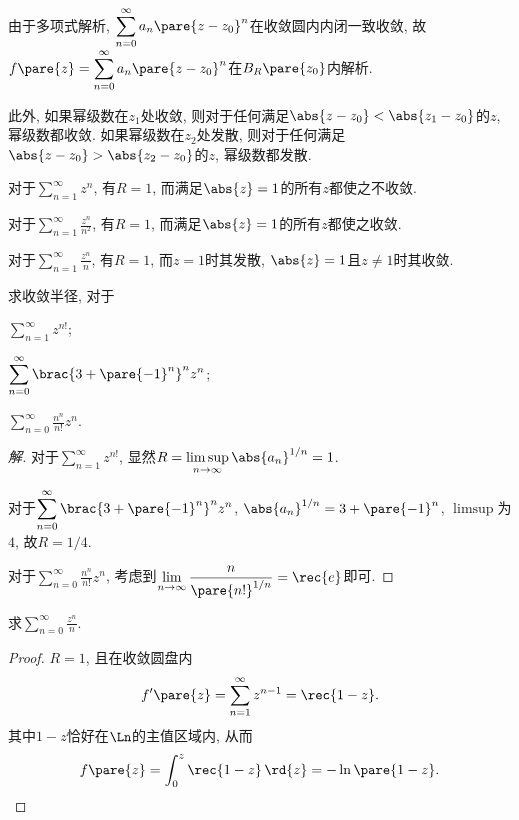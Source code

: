 \documentclass[../ComplexVariable.tex]{subfiles}
\begin{document}
由于多项式解析, $\displaystyle \sum_{n=0}^\infty a_n\pare{z-z_0}^n$在收敛圆内内闭一致收敛, 故$f\pare{z} = \displaystyle \sum_{n=0}^\infty a_n\pare{z-z_0}^n$在$B_R\pare{z_0}$内解析.
\par
此外, 如果幂级数在$z_1$处收敛, 则对于任何满足$\abs{z-z_0}<\abs{z_1-z_0}$的$z$, 幂级数都收敛. 如果幂级数在$z_2$处发散, 则对于任何满足$\abs{z-z_0}>\abs{z_2-z_0}$的$z$, 幂级数都发散.
\begin{sample}
    \begin{ex}
        对于$\displaystyle \sum_{n=1}^\infty z^n$, 有$R=1$, 而满足$\abs{z}=1$的所有$z$都使之不收敛.
    \end{ex}
    \begin{ex}
        对于$\displaystyle \sum_{n=1}^\infty \frac{z^n}{n^2}$, 有$R=1$, 而满足$\abs{z}=1$的所有$z$都使之收敛.
    \end{ex}
    \begin{ex}
        对于$\displaystyle \sum_{n=1}^\infty \frac{z^n}{n}$, 有$R=1$, 而$z=1$时其发散, $\abs{z}=1$且$z\neq 1$时其收敛.
    \end{ex}
\end{sample}
\begin{sample}
    \begin{ex}
        求收敛半径, 对于
        \begin{cenum}
            \item $\displaystyle \sum_{n=1}^\infty z^{n!}$;
            \item $\displaystyle \sum_{n=0}^\infty \brac{3+\pare{-1}^n}^nz^n$;
            \item $\displaystyle \sum_{n=0}^\infty \frac{n^n}{n!}z^n$.
        \end{cenum}
    \end{ex}
    \begin{proof}[解]
        对于$\displaystyle \sum_{n=1}^\infty z^{n!}$, 显然$R = \limsup\limits_{n\rightarrow \infty} \abs{a_n}^{1/n} = 1$.
        \par
        对于$\displaystyle \sum_{n=0}^\infty \brac{3+\pare{-1}^n}^nz^n$, $\abs{a_n}^{1/n} = 3+\pare{-1}^n$, $\limsup$为$4$, 故$R = 1/4$.
        \par
        对于$\displaystyle \sum_{n=0}^\infty \frac{n^n}{n!}z^n$, 考虑到$\displaystyle \lim_{n\rightarrow \infty} \frac{n}{\pare{n!}^{1/n}} = \rec{e}$即可.
    \end{proof}
\end{sample}
\begin{sample}
    \begin{ex}
        求$\displaystyle \sum_{n=0}^\infty \frac{z^n}{n}$.
    \end{ex}
    \begin{proof}
        $R=1$, 且在收敛圆盘内
        \[ f'\pare{z} = \sum_{n=1}^\infty z^{n-1} = \rec{1-z}. \]
        其中$1-z$恰好在$\Ln$的主值区域内, 从而
        \[ f\pare{z} = \int_{0}^z \rec{1-z}\,\rd{z} = -\ln\pare{1-z}. \qedhere \]
    \end{proof}
\end{sample}
\end{document}

